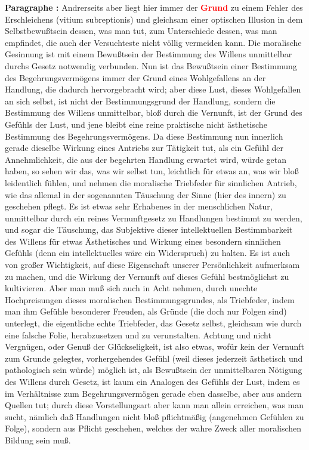 \documentclass[a4paper,12pt,twoside]{book}
\newcommand{\match}[1]{\textcolor{red}{\textbf{#1}}}
\begin{document}
	\noindent\textbf{Paragraphe : }Andrerseits aber liegt hier immer der \match{Grund} zu einem Fehler des Erschleichens (vitium subreptionis) und gleichsam einer optischen Illusion in dem Selbstbewußtsein dessen, was man tut, zum Unterschiede dessen, was man empfindet, die auch der Versuchteste nicht völlig vermeiden kann. Die moralische Gesinnung ist mit einem Bewußtsein der Bestimmung des Willens unmittelbar durchs Gesetz notwendig verbunden. Nun ist das Bewußtsein einer Bestimmung des Begehrungsvermögens immer der Grund  eines Wohlgefallens an der Handlung, die dadurch hervorgebracht wird; aber diese Lust, dieses Wohlgefallen an sich selbst, ist nicht der Bestimmungsgrund der Handlung, sondern die Bestimmung des Willens unmittelbar, bloß durch die Vernunft, ist der Grund des Gefühls der Lust, und jene bleibt eine reine praktische nicht ästhetische Bestimmung des Begehrungsvermögens. Da diese Bestimmung nun innerlich gerade dieselbe Wirkung eines Antriebs zur Tätigkeit tut, als ein Gefühl der Annehmlichkeit, die aus der begehrten Handlung erwartet wird, würde getan haben, so sehen wir das, was wir selbst tun, leichtlich für etwas an, was wir bloß leidentlich fühlen, und nehmen die moralische Triebfeder für sinnlichen Antrieb, wie das allemal in der sogenannten Täuschung der Sinne (hier des innern) zu geschehen pflegt. Es ist etwas sehr Erhabenes in der menschlichen Natur, unmittelbar durch ein reines Vernunftgesetz zu Handlungen bestimmt zu werden, und sogar die Täuschung, das Subjektive dieser intellektuellen Bestimmbarkeit des Willens für etwas Ästhetisches und Wirkung eines besondern sinnlichen Gefühls (denn ein intellektuelles wäre ein Widerspruch) zu halten. Es ist auch von großer Wichtigkeit, auf diese Eigenschaft unserer Persönlichkeit aufmerksam zu machen, und die Wirkung der Vernunft auf dieses Gefühl bestmöglichst zu kultivieren. Aber man muß sich auch in Acht nehmen, durch unechte Hochpreisungen dieses moralischen Bestimmungsgrundes, als Triebfeder, indem man ihm Gefühle besonderer Freuden, als Gründe (die doch nur Folgen sind) unterlegt, die eigentliche echte Triebfeder, das Gesetz selbst, gleichsam wie durch eine falsche Folie, herabzusetzen und zu verunstalten. Achtung und nicht Vergnügen, oder Genuß der Glückseligkeit, ist also etwas, wofür kein der Vernunft zum Grunde gelegtes, vorhergehendes Gefühl (weil dieses jederzeit ästhetisch und pathologisch sein würde) möglich ist, als Bewußtsein der unmittelbaren Nötigung des Willens durch Gesetz, ist kaum ein Analogen des Gefühls der Lust, indem es im Verhältnisse zum Begehrungsvermögen gerade eben dasselbe, aber aus andern Quellen  tut; durch diese Vorstellungsart aber kann man allein erreichen, was man sucht, nämlich daß Handlungen nicht bloß pflichtmäßig (angenehmen Gefühlen zu Folge), sondern aus Pflicht geschehen, welches der wahre Zweck aller moralischen Bildung sein muß. 
	
\end{document}
